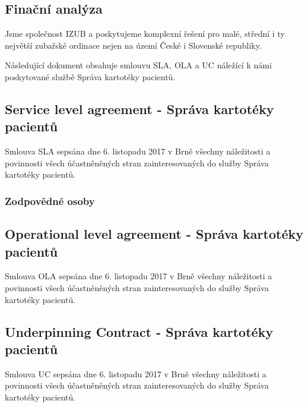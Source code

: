 \documentclass[11pt, a4paper, titlepage]{article}
\begin{document}
	
	\pagestyle{fancy}

	\begin{center}
		\section*{Finační analýza}
	\end{center}

	\noindent Jsme společnost IZUB a poskytujeme komplexní řešení pro malé, střední i ty největší zubařské ordinace nejen na území České i Slovenské republiky.

	\noindent Následující dokument obsahuje smlouvu SLA, OLA a UC náležící k námi poskytované službě Správa kartotéky pacientů.

	\noindent\makebox[\linewidth]{\rule{17.5cm}{0.4pt}}

	\vspace {1.5em}

	\subsection*{Service level agreement - Správa kartotéky pacientů}

	Smlouva SLA sepsána dne 6. listopadu 2017 v Brně všechny náležitosti a povinnosti všech účastněněných stran zainteresovaných do služby Správa kartotéky pacientů.

	\subsubsection*{Zodpovědné osoby}


	\subsection*{Operational level agreement - Správa kartotéky pacientů}

	Smlouva OLA sepsána dne 6. listopadu 2017 v Brně všechny náležitosti a povinnosti všech účastněněných stran zainteresovaných do služby Správa kartotéky pacientů.

	\subsection*{Underpinning Contract - Správa kartotéky pacientů}
	
	Smlouva UC sepsána dne 6. listopadu 2017 v Brně všechny náležitosti a povinnosti všech účastněněných stran zainteresovaných do služby Správa kartotéky pacientů.

	
\end{document}
